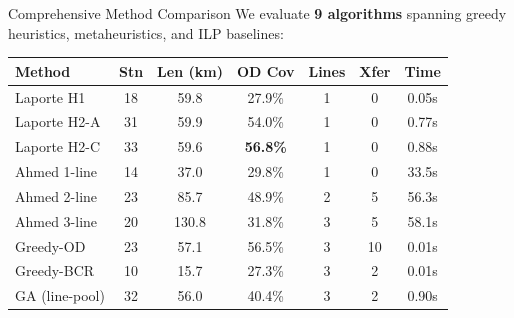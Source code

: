 \documentclass[final]{beamer}
\begin{document}
\begin{frame}[t]
\begin{minipage}[t]{0.50\paperwidth}
\begin{block}{\Large Comprehensive Method Comparison}
\normalsize
We evaluate \textbf{9 algorithms} spanning greedy heuristics, metaheuristics, and ILP baselines:
\begin{center}
\small
\begin{tabular}{@{}lcccccc@{}}
\toprule
\textbf{Method} & \textbf{Stn} & \textbf{Len (km)} & \textbf{OD Cov} & \textbf{Lines} & \textbf{Xfer} & \textbf{Time} \\
\midrule
\rowcolor{softgray} Laporte H1   & 18 & 59.8 & 27.9\% & 1 & 0 & 0.05s \\
\rowcolor{white}  Laporte H2-A & 31 & 59.9 & 54.0\% & 1 & 0 & 0.77s \\
\rowcolor{softgray} Laporte H2-C & 33 & 59.6 & \textbf{56.8\%} & 1 & 0 & 0.88s \\
\midrule
\rowcolor{white}  Ahmed 1-line & 14 & 37.0 & 29.8\% & 1 & 0 & 33.5s \\
\rowcolor{softgray} Ahmed 2-line & 23 & 85.7 & 48.9\% & 2 & 5 & 56.3s \\
\rowcolor{white}  Ahmed 3-line & 20 & 130.8 & 31.8\% & 3 & 5 & 58.1s \\
\midrule
\rowcolor{softgray} Greedy-OD    & 23 & 57.1 & 56.5\% & 3 & 10 & 0.01s \\
\rowcolor{white}  Greedy-BCR   & 10 & 15.7 & 27.3\% & 3 & 2 & 0.01s \\
\rowcolor{softgray} GA (line-pool) & 32 & 56.0 & 40.4\% & 3 & 2 & 0.90s \\
\bottomrule
\end{tabular}
\end{center}
\end{block}

\vspace{0.2cm}


\end{minipage}
\end{frame}
\end{document}
